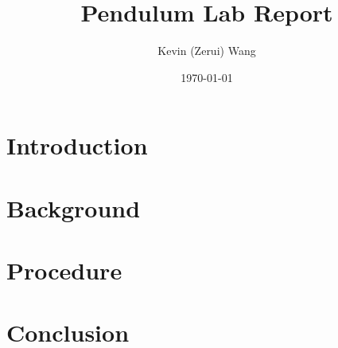 \documentclass[12pt]{article}
\title{Pendulum Lab Report}
\author{Kevin (Zerui) Wang}
\date{\today}
\begin{document}

\maketitle

\newpage


\section*{Introduction}
\section*{Background}
\section*{Procedure}
\section{Conclusion}
\end{document}

